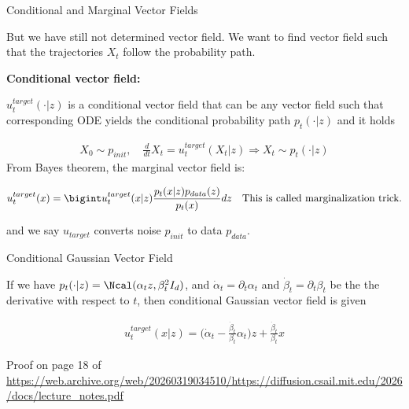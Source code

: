 \documentclass[aspectratio=169,xcolor=dvipsnames,svgnames,x11names,fleqn]{beamer}
\begin{document}
\begin{frame}{Conditional and Marginal Vector Fields}

    \footnotesize 

    \begin{center}
        But we have still not determined vector field. We want to find vector field such that the trajectories $X_t$ follow the probability path.
    \end{center}

    \textbf{Conditional vector field:}

    $u_t^{target}(\cdot | z)$  is a conditional vector field that can be any vector field such that corresponding ODE yields the conditional probability path $p_t(\cdot | z)$ and it holds

    \begin{align*}
        X_0 \sim p_{init}, \quad \frac{d}{dt}X_t = u_t^{target}(X_t | z) \Rightarrow  X_t \sim p_t(\cdot | z)
    \end{align*}
    From Bayes theorem, the marginal vector field is:

        \begin{tcolorbox}[enhanced, sharp corners, boxrule=0.0pt, leftrule = 0.0em, toprule = 0.0em, colframe=white!80!springGreen, colback=cashyellow!20,
        notitle, left=1mm ]
        \begin{align*}
            u_t^{target}(x) = \bigint u_t^{target}(x|z) \frac{p_t(x|z)p_{data}(z)}{p_t(x)}dz \quad \text{This is called marginalization trick.}
        \end{align*}
        \end{tcolorbox}
        and we say $u_{target}$ converts noise $p_{init}$ to data $p_{data}$.

    
\end{frame}



\begin{frame}{Conditional Gaussian Vector Field}

    If we have $p_t(\cdot | z) = \Ncal(\alpha_t z, \beta_t^2 I_d)$, and $\dot{\alpha}_t  = \partial_t \alpha_t$ and  $\dot{\beta}_t  = \partial_t \beta_t$ be the the derivative with respect to $t$, then conditional Gaussian vector field is given 

    \begin{align*}
        u_t^{target}(x|z) = \bigg( \dot{\alpha}_t - \frac{\dot{\beta}_t}{\beta_t}\alpha_t \bigg)z + \frac{\dot{\beta}_t}{\beta_t}x
    \end{align*}

    \vspace{5pt}
    {\footnotesize Proof on page 18 of  \url{https://web.archive.org/web/20260319034510/https://diffusion.csail.mit.edu/2026/docs/lecture_notes.pdf}}
    
\end{frame}
\end{document}
